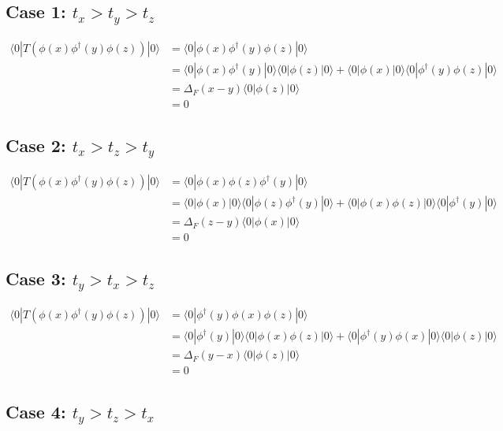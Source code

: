{\subsection*{Case 1: \( t_x > t_y > t_z \)}

\begin{align*}
\langle 0 | T(\phi(x) \phi^\dagger(y) \phi(z)) | 0 \rangle &= \langle 0 | \phi(x) \phi^\dagger(y) \phi(z) | 0 \rangle \\
&= \langle 0 | \phi(x) \phi^\dagger(y) | 0 \rangle \langle 0 | \phi(z) | 0 \rangle + \langle 0 | \phi(x) | 0 \rangle \langle 0 | \phi^\dagger(y) \phi(z) | 0 \rangle \\
&= \Delta_F(x - y) \langle 0 | \phi(z) | 0 \rangle \\
&= 0
\end{align*}

\subsection*{Case 2: \( t_x > t_z > t_y \)}

\begin{align*}
\langle 0 | T(\phi(x) \phi^\dagger(y) \phi(z)) | 0 \rangle &= \langle 0 | \phi(x) \phi(z) \phi^\dagger(y) | 0 \rangle \\
&= \langle 0 | \phi(x) | 0 \rangle \langle 0 | \phi(z) \phi^\dagger(y) | 0 \rangle + \langle 0 | \phi(x) \phi(z) | 0 \rangle \langle 0 | \phi^\dagger(y) | 0 \rangle \\
&= \Delta_F(z - y) \langle 0 | \phi(x) | 0 \rangle \\
&= 0
\end{align*}

\subsection*{Case 3: \( t_y > t_x > t_z \)}

\begin{align*}
\langle 0 | T(\phi(x) \phi^\dagger(y) \phi(z)) | 0 \rangle &= \langle 0 | \phi^\dagger(y) \phi(x) \phi(z) | 0 \rangle \\
&= \langle 0 | \phi^\dagger(y) | 0 \rangle \langle 0 | \phi(x) \phi(z) | 0 \rangle + \langle 0 | \phi^\dagger(y) \phi(x) | 0 \rangle \langle 0 | \phi(z) | 0 \rangle \\
&= \Delta_F(y - x) \langle 0 | \phi(z) | 0 \rangle \\
&= 0
\end{align*}

\subsection*{Case 4: \( t_y > t_z > t_x \)}

}
